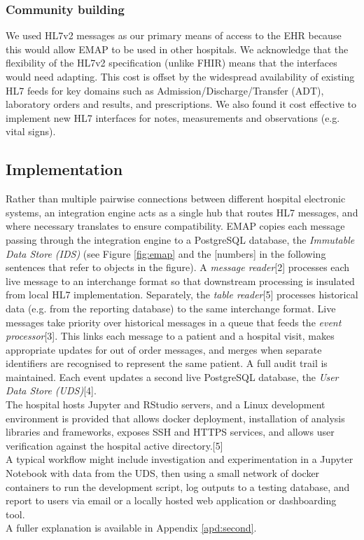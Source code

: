 \documentclass[pmlr,twocolumn,10pt]{jmlr} %
\begin{document}
\subsubsection{Community building}
We used HL7v2 messages as our primary means of access to the EHR because this would allow EMAP to be used in other hospitals. We acknowledge that the flexibility of the HL7v2 specification (unlike FHIR) means that the interfaces would need adapting. This cost is offset by the widespread availability of existing HL7 feeds for key domains such as Admission/Discharge/Transfer (ADT), laboratory orders and results, and prescriptions. We also found it cost effective to implement new HL7 interfaces for notes, measurements and observations (e.g. vital signs).

\subsection{Implementation}
Rather than multiple pairwise connections between different hospital electronic systems, an integration engine acts as a single hub that routes HL7 messages, and where necessary translates to ensure compatibility. EMAP  copies each message passing through the integration engine to a PostgreSQL database, the \textit{Immutable Data Store (IDS)} (see Figure \ref{fig:emap} and the [numbers] in the following sentences that refer to objects in the figure). A \textit{message reader}[2] processes each live message to an interchange format so that downstream processing is insulated from local HL7 implementation. Separately, the \textit{table reader}[5] processes historical data (e.g. from the reporting database) to the same interchange format. Live messages take priority over historical messages in a queue that feeds the \textit{event processor}[3]. This links each message to a patient and a hospital visit, makes appropriate updates for out of order messages, and merges when separate identifiers are recognised to represent the same patient. A full audit trail is maintained. Each event updates a second live PostgreSQL database, the \textit{User Data Store (UDS)}[4].\\
The hospital hosts Jupyter and RStudio servers, and a Linux development environment is provided that allows docker deployment, installation of analysis libraries and frameworks, exposes SSH and HTTPS services, and allows user verification against the hospital active directory.[5] \\
A typical workflow might include investigation and experimentation in a Jupyter Notebook with data from the UDS, then using a small network of docker containers to run the development script, log outputs to a testing database, and report to users via email or a locally hosted web application or dashboarding tool. \\
A fuller explanation is available in Appendix \ref{apd:second}.
\end{document}
